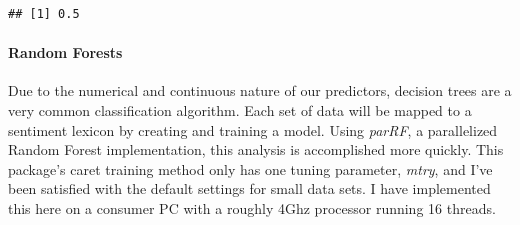 \documentclass[
]{article}
\newenvironment{Shaded}{\begin{snugshade}}{\end{snugshade}}
\newcommand{\AttributeTok}[1]{\textcolor[rgb]{0.77,0.63,0.00}{#1}}
\newcommand{\CommentTok}[1]{\textcolor[rgb]{0.56,0.35,0.01}{\textit{#1}}}
\newcommand{\ConstantTok}[1]{\textcolor[rgb]{0.00,0.00,0.00}{#1}}
\newcommand{\DecValTok}[1]{\textcolor[rgb]{0.00,0.00,0.81}{#1}}
\newcommand{\FunctionTok}[1]{\textcolor[rgb]{0.00,0.00,0.00}{#1}}
\newcommand{\NormalTok}[1]{#1}
\newcommand{\OtherTok}[1]{\textcolor[rgb]{0.56,0.35,0.01}{#1}}
\newcommand{\SpecialCharTok}[1]{\textcolor[rgb]{0.00,0.00,0.00}{#1}}
\begin{document}
\begin{Shaded}
\end{Shaded}

\begin{verbatim}
## [1] 0.5
\end{verbatim}

\hypertarget{random-forests}{%
\paragraph{Random Forests}\label{random-forests}}

Due to the numerical and continuous nature of our predictors, decision
trees are a very common classification algorithm. Each set of data will
be mapped to a sentiment lexicon by creating and training a model. Using
\emph{parRF}, a parallelized Random Forest implementation, this analysis
is accomplished more quickly. This package's caret training method only
has one tuning parameter, \emph{mtry}, and I've been satisfied with the
default settings for small data sets. I have implemented this here on a
consumer PC with a roughly 4Ghz processor running 16 threads.
\end{document}
